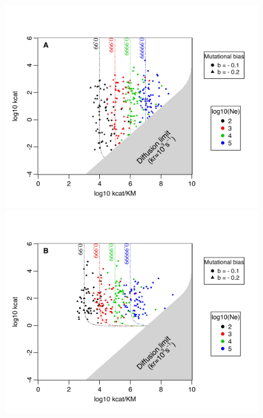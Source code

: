 \begin{figure}[h!]
\centering
\begin{minipage}[c]{0.5\linewidth}
\includegraphics[scale=0.65,trim=0.25cm 0cm 0.5cm 1.5cm,clip]{pics/Enzymes/2DFitLandscape_Evo_Results_lowF_withbias_Def.jpeg} 
\end{minipage} \hspace{0.5cm}\hfill
\begin{minipage}[c]{0.46\linewidth}
\includegraphics[scale=0.65,trim=0cm 0cm 3.5cm 1.5cm,clip]{pics/Enzymes/2DFitLandscape_Evo_Results_highF_withbias_Def.jpeg} 

\end{minipage}
\end{figure}
